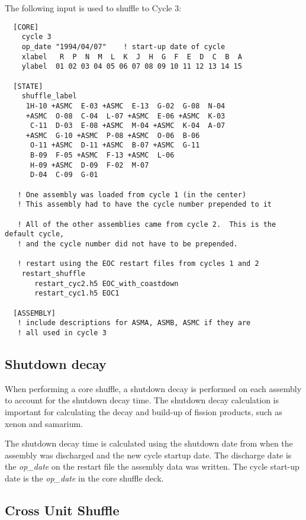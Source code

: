 The following input is used to shuffle to Cycle 3:
\begin{verbatim}
  [CORE]
    cycle 3
    op_date "1994/04/07"    ! start-up date of cycle
    xlabel   R  P  N  M  L  K  J  H  G  F  E  D  C  B  A
    ylabel  01 02 03 04 05 06 07 08 09 10 11 12 13 14 15

  [STATE]
    shuffle_label
     1H-10 +ASMC  E-03 +ASMC  E-13  G-02  G-08  N-04
     +ASMC  O-08  C-04  L-07 +ASMC  E-06 +ASMC  K-03
      C-11  D-03  E-08 +ASMC  M-04 +ASMC  K-04  A-07
     +ASMC  G-10 +ASMC  P-08 +ASMC  O-06  B-06
      O-11 +ASMC  D-11 +ASMC  B-07 +ASMC  G-11
      B-09  F-05 +ASMC  F-13 +ASMC  L-06
      H-09 +ASMC  D-09  F-02  M-07
      D-04  C-09  G-01

   ! One assembly was loaded from cycle 1 (in the center)
   ! This assembly had to have the cycle number prepended to it

   ! All of the other assemblies came from cycle 2.  This is the default cycle,
   ! and the cycle number did not have to be prepended.

   ! restart using the EOC restart files from cycles 1 and 2
    restart_shuffle
       restart_cyc2.h5 EOC_with_coastdown
       restart_cyc1.h5 EOC1

  [ASSEMBLY]
   ! include descriptions for ASMA, ASMB, ASMC if they are
   ! all used in cycle 3
\end{verbatim}

\subsection{Shutdown decay}
When performing a core shuffle, a shutdown decay is performed on each assembly to account for
the shutdown decay time.  The shutdown decay calculation is important for calculating the decay and
build-up of fission products, such as xenon and samarium.

The shutdown decay time is calculated using the shutdown date from when the assembly was discharged 
and the new cycle startup date.  The discharge date is the {\it op\_date} on the restart file
the assembly data was written.
The cycle start-up date is the {\it op\_date} in the core shuffle deck.

\subsection{Cross Unit Shuffle}

